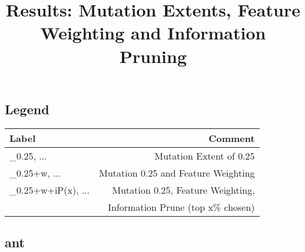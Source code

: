 \documentclass{article}
\begin{document}
\title{\LARGE\textbf{Results: Mutation Extents, Feature Weighting and 
Information Pruning}}
\date{}
\maketitle
\subsection*{Legend}
\begin{tabular}{|l|r|}
\hline
\textbf{Label} & \textbf{Comment}\bigstrut\\\hline
\_0.25, ... & Mutation Extent of 0.25\bigstrut\\\hline
\_0.25+w, ... & Mutation 0.25 and Feature Weighting\bigstrut\\\hline
\_0.25+w+iP(x), ... & Mutation 0.25, Feature Weighting,\bigstrut\\
& Information Prune (top x\% chosen) \bigstrut\\\hline
\end{tabular}

\subsection*{ant}
\end{document}
